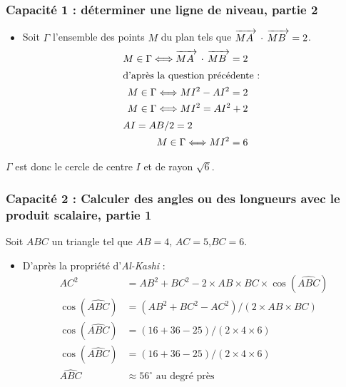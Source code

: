 \documentclass[11pt, hyperref={urlcolor=red,%
            linkcolor=blue, %
            colorlinks=true}]{beamer}
\newcommand{\scal}[2]{\vect{#1} \, \cdot \, \vect{#2}}
\newcommand{\vect}[1]{\mathchoice%
{\overrightarrow{\displaystyle\mathstrut#1\,\,}}%
{\overrightarrow{\textstyle\mathstrut#1\,\,}}%
{\overrightarrow{\scriptstyle\mathstrut#1\,\,}}%
{\overrightarrow{\scriptscriptstyle\mathstrut#1\,\,}}}
\begin{document}
\begin{frame}
\frametitle{Capacité 1 : déterminer une ligne de niveau, partie 2}
\begin{itemize}
 \item Soit $\Gamma$ l'ensemble des points $M$ du plan tels que  
    $\scal{MA}{MB}=2$. 
\begin{align*}
M \in \Gamma \Longleftrightarrow  \scal{MA}{MB}=2 \\
\intertext{d'après la question précédente :  }
M \in \Gamma \Longleftrightarrow MI^{2}- AI^{2} = 2 \\
M \in \Gamma \Longleftrightarrow MI^{2}=  AI^{2} + 2 \\
\intertext{$AI=AB/2=2$  }
M \in \Gamma \Longleftrightarrow MI^{2}= 6 \\
\end{align*}
\end{itemize}
$\Gamma$ est donc le cercle de centre $I$ et de rayon $\sqrt{6}$.
\end{frame}

\begin{frame}
\frametitle{Capacité 2 : Calculer des angles ou des longueurs avec le produit scalaire, partie 1}

Soit $ABC$ un triangle tel que $AB=4$, $AC=5$,$BC=6$.

\begin{itemize}
\pause \item  D'après la propriété d'\textit{Al-Kashi} :
\begin{align*}
AC^{2} &=AB^{2} + BC^{2} - 2 \times AB \times BC \times \cos(\widehat{ABC})\\
\cos(\widehat{ABC}) &= (AB^{2} + BC^{2}  - AC^{2})/(2\times AB \times BC)\\
\cos(\widehat{ABC}) &= (16 + 36  - 25)/(2\times 4\times 6)\\
\cos(\widehat{ABC}) &= (16 + 36  - 25)/(2\times 4\times 6)\\
\widehat{ABC} &\approx 56^{\circ} \text{ au degré près}
\end{align*}

\end{itemize}
\end{frame}
\end{document}
